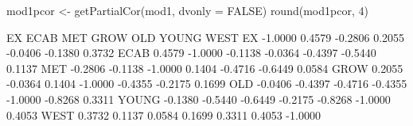 \begin{Schunk}
\begin{Sinput}
 mod1pcor <- getPartialCor(mod1, dvonly = FALSE)
 round(mod1pcor, 4)
\end{Sinput}
\begin{Soutput}
           EX    ECAB     MET    GROW     OLD   YOUNG    WEST
EX    -1.0000  0.4579 -0.2806  0.2055 -0.0406 -0.1380  0.3732
ECAB   0.4579 -1.0000 -0.1138 -0.0364 -0.4397 -0.5440  0.1137
MET   -0.2806 -0.1138 -1.0000  0.1404 -0.4716 -0.6449  0.0584
GROW   0.2055 -0.0364  0.1404 -1.0000 -0.4355 -0.2175  0.1699
OLD   -0.0406 -0.4397 -0.4716 -0.4355 -1.0000 -0.8268  0.3311
YOUNG -0.1380 -0.5440 -0.6449 -0.2175 -0.8268 -1.0000  0.4053
WEST   0.3732  0.1137  0.0584  0.1699  0.3311  0.4053 -1.0000
\end{Soutput}
\end{Schunk}
